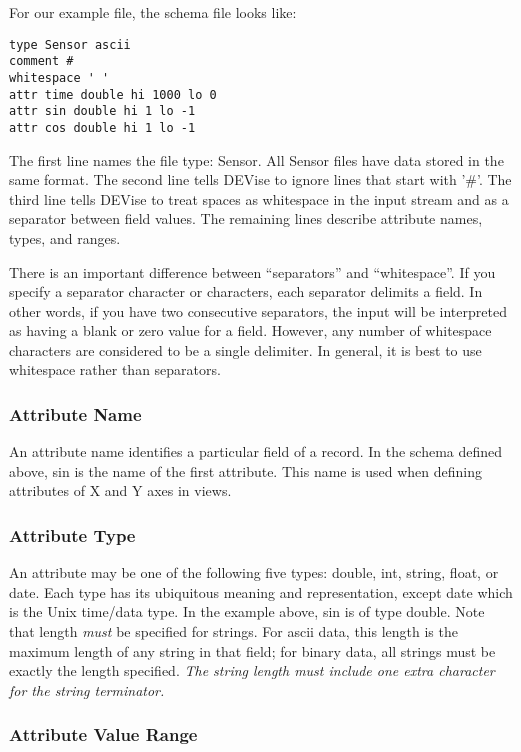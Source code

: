 For our example file, the schema file looks like:

\begin{verbatim}
type Sensor ascii
comment #
whitespace ' '
attr time double hi 1000 lo 0
attr sin double hi 1 lo -1
attr cos double hi 1 lo -1
\end{verbatim}

The first line names the file type: Sensor. All Sensor files have data stored in
the same format. The second line tells DEVise to ignore lines that start with
'\#'. The third line tells DEVise to treat spaces as whitespace in the input
stream and as a separator between field values. The remaining lines describe
attribute names, types, and ranges.

There is an important difference between ``separators'' and ``whitespace''.
If you specify a separator character or characters, each separator delimits
a field.  In other words, if you have two consecutive separators, the
input will be interpreted as having a blank or zero value for a field.
However, any number of whitespace characters are considered to be a single
delimiter.  In general, it is best to use whitespace rather than separators.

\subsubsection{Attribute Name}

An attribute name identifies a particular field of a record. In the schema
defined above, sin is the name of the first attribute. This name is used when
defining attributes of X and Y axes in views.

\subsubsection{Attribute Type}

An attribute may be one of the following five types: double, int, string, float,
or date. Each type has its ubiquitous meaning and representation, except date
which is the Unix time/data type. In the example above, sin is of type double.
Note that length {\em must} be specified for strings.  For ascii data, this
length is the maximum length of any string in that field; for binary data, all
strings must be exactly the length specified.  {\em The string length must
include one extra character for the string terminator.}

\subsubsection{Attribute Value Range}

